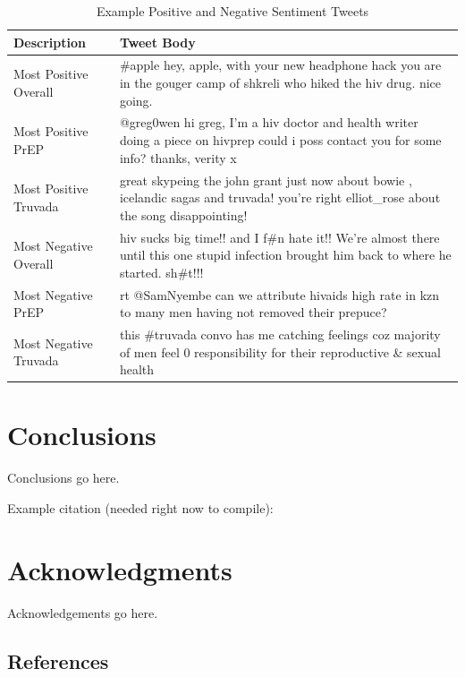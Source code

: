 \documentclass{sig-alternate-05-2015}
\begin{document}
\begin{table}
\centering
\caption{Example Positive and Negative Sentiment Tweets}
\begin{tabular}{|l|p{10cm}|} \hline
Description & Tweet Body\\ \hline
Most Positive Overall & \#apple hey, apple, with your new headphone hack you are in the gouger camp of shkreli who hiked the hiv drug. nice going.\\ \hline
Most Positive PrEP & @greg0wen hi greg, I'm a hiv doctor and health writer doing a piece on hivprep could i poss contact you for some info? thanks, verity x\\ \hline
Most Positive Truvada & great skypeing the john grant just now about bowie , icelandic sagas and truvada! you're right elliot\_rose about the song disappointing!\\ \hline

Most Negative Overall & hiv sucks big time!! and I f\#n hate it!! We're almost there until this one stupid infection brought him back to where he started. sh\#t!!!\\ \hline
Most Negative PrEP & rt @SamNyembe can we attribute hivaids high rate in kzn to many men having not removed their prepuce? \\ \hline
Most Negative Truvada & this \#truvada convo has me catching feelings coz majority of men feel 0 responsibility for their reproductive \& sexual health\\ \hline

\hline\end{tabular}
\end{table}


\section{Conclusions}

Conclusions go here.

Example citation (needed right now to compile):\cite{Lamport:LaTeX}


\section{Acknowledgments}

Acknowledgements go here.

%

%
%


\subsection{References}
\end{document}
